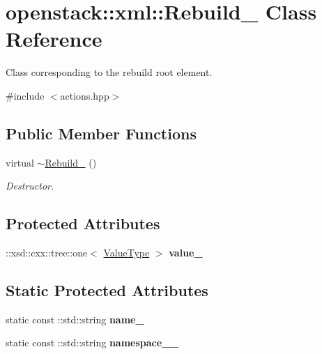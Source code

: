 \hypertarget{classopenstack_1_1xml_1_1Rebuild__}{
\section{openstack::xml::Rebuild\_\- Class Reference}
\label{classopenstack_1_1xml_1_1Rebuild__}
}


Class corresponding to the rebuild root element.  




{\ttfamily \#include $<$actions.hpp$>$}

\subsection*{Public Member Functions}
\begin{DoxyCompactItemize}
\item 
\hypertarget{classopenstack_1_1xml_1_1Rebuild___abf41a5966cd2682d400fe93e6f6331f2}{
virtual \hyperlink{classopenstack_1_1xml_1_1Rebuild___abf41a5966cd2682d400fe93e6f6331f2}{$\sim$Rebuild\_\-} ()}
\label{classopenstack_1_1xml_1_1Rebuild___abf41a5966cd2682d400fe93e6f6331f2}

\begin{DoxyCompactList}\small\item\em Destructor. \item\end{DoxyCompactList}\end{DoxyCompactItemize}
\subsection*{Protected Attributes}
\begin{DoxyCompactItemize}
\item 
\hypertarget{classopenstack_1_1xml_1_1Rebuild___a01fe11f6ebd415a6954dec92fd73f794}{
::xsd::cxx::tree::one$<$ \hyperlink{classopenstack_1_1xml_1_1Rebuild}{ValueType} $>$ {\bfseries value\_\-}}
\label{classopenstack_1_1xml_1_1Rebuild___a01fe11f6ebd415a6954dec92fd73f794}

\end{DoxyCompactItemize}
\subsection*{Static Protected Attributes}
\begin{DoxyCompactItemize}
\item 
\hypertarget{classopenstack_1_1xml_1_1Rebuild___a5452da159f89d2879ee36989e0d17db2}{
static const ::std::string {\bfseries name\_\-}}
\label{classopenstack_1_1xml_1_1Rebuild___a5452da159f89d2879ee36989e0d17db2}

\item 
\hypertarget{classopenstack_1_1xml_1_1Rebuild___a1ba3654a36a85aba1853594335d28a95}{
static const ::std::string {\bfseries namespace\_\-\_\-}}
\label{classopenstack_1_1xml_1_1Rebuild___a1ba3654a36a85aba1853594335d28a95}

\end{DoxyCompactItemize}
